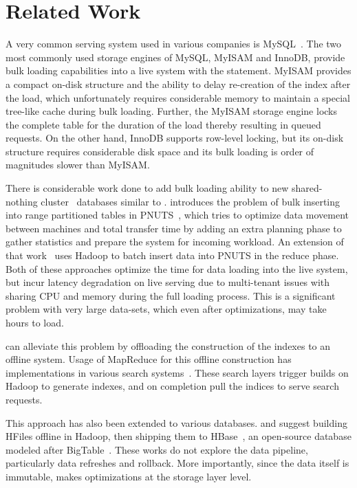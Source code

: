 \section{Related Work}
\label{sec:related_work}

A very common serving system used in various companies is
MySQL~\cite{mysql}. The two most commonly used storage engines of
MySQL, MyISAM and InnoDB, provide bulk loading capabilities into a
live system with the  statement. MyISAM provides
a compact on-disk structure and the ability to delay re-creation of
the index after the load, which unfortunately requires considerable
memory to maintain a special tree-like cache during bulk loading.
Further, the MyISAM storage engine locks the complete table for the
duration of the load thereby resulting in queued requests. On the
other hand, InnoDB supports row-level locking, but its on-disk
structure requires considerable disk space and its bulk loading is
order of magnitudes slower than MyISAM. 

There is considerable work done to add bulk loading ability to new
shared-nothing cluster~\cite{sharednothing} databases similar to
\projectname{}. \citet{silberstein} introduces the problem of bulk
inserting into range partitioned tables in PNUTS~\cite{pnuts}, which
tries to optimize data movement between machines and total transfer
time by adding an extra planning phase to gather statistics and
prepare the system for incoming workload. An extension of that
work~\citet{pnutsbatch} uses Hadoop to batch insert data into PNUTS in
the reduce phase. Both of these approaches optimize the time for data
loading into the live system, but incur latency degradation on live
serving due to multi-tenant issues with sharing CPU and memory during
the full loading process. This is a significant problem with very large
data-sets, which even after optimizations, may take hours to load.  

\projectname{} can alleviate this problem by offloading the
construction of the indexes to an offline system. Usage of MapReduce
for this offline construction has implementations in various
search systems~\cite{dean,mika}.
These search layers trigger builds on Hadoop to generate indexes, and
on completion pull the indices to serve search requests. 

This approach has also been extended to various databases.
\citet{konstantinou} and \citet{barbuzzi} suggest building HFiles
offline in Hadoop, then shipping them to HBase~\cite{hbase}, an
open-source database modeled after BigTable~\cite{bigtable}. These
works do not explore the data pipeline, particularly data refreshes
and rollback. More importantly, since the data itself is immutable,
\projectname{} makes optimizations at the storage layer level.

